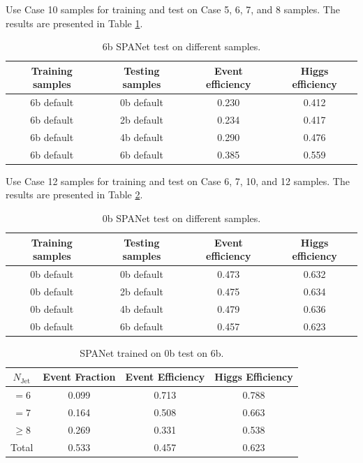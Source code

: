 \documentclass[12pt]{article}
\begin{document}
		Use Case 10 samples for training and test on Case 5, 6, 7, and 8 samples. The results are presented in Table \ref{tab:SPANet_10M_6b_default_test_on_different_triHiggs_data}.
		\begin{table}[htpb]
			\centering
			\caption{6b SPANet test on different samples.}
			\label{tab:SPANet_10M_6b_default_test_on_different_triHiggs_data}
			\begin{tabular}{cc|cc}
				Training samples & Testing samples & Event efficiency & Higgs efficiency \\
				\hline 
				6b default      & 0b default     & 0.230        & 0.412    \\
				6b default      & 2b default     & 0.234        & 0.417    \\
				6b default      & 4b default     & 0.290        & 0.476    \\
				6b default      & 6b default     & 0.385        & 0.559    \\
			\end{tabular}
		\end{table}	

		Use Case 12 samples for training and test on Case 6, 7, 10, and 12 samples. The results are presented in Table \ref{tab:SPANet_10M_0b_default_test_on_different_triHiggs_data}. 
		\begin{table}[htpb]
			\centering
			\caption{0b SPANet test on different samples.}
			\label{tab:SPANet_10M_0b_default_test_on_different_triHiggs_data}
			\begin{tabular}{cc|cc}
				Training samples & Testing samples & Event efficiency & Higgs efficiency \\
				\hline 
				0b default      & 0b default     & 0.473        & 0.632    \\
				0b default      & 2b default     & 0.475        & 0.634    \\
				0b default      & 4b default     & 0.479        & 0.636    \\
				0b default      & 6b default     & 0.457        & 0.623    \\
			\end{tabular}
		\end{table}	

		\begin{table}[htpb]
			\centering
			\caption{SPANet trained on 0b test on 6b.}
			\label{tab:SPANet_test_on_different_triHiggs_data}
			\begin{tabular}{c|c|cc}
				$N_\text{Jet}$ & Event Fraction & Event Efficiency & Higgs Efficiency \\
				\hline
				$=6$	  &   0.099             &    0.713              &    0.788             \\
				$=7$	  &   0.164             &    0.508              &    0.663             \\
				$\ge 8$	  &   0.269             &    0.331              &    0.538             \\
				Total	  &   0.533             &    0.457              &    0.623             \\
			\end{tabular}
		\end{table}
\end{document}
